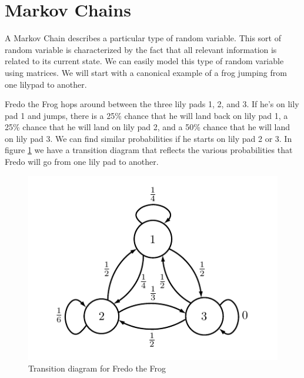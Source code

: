 \label{lab:MarkovGraph}


\section*{Markov Chains}


A Markov Chain describes a particular type of random variable.
This sort of random variable is characterized by the fact that all relevant information is related to its current state.
We can easily model this type of random variable using matrices.
We will start with a canonical example of a frog jumping from one lilypad to another.

Fredo the Frog hops around between the three lily pads 1, 2, and 3.
If he's on lily pad 1 and jumps, there is a 25\% chance that he will land back on lily pad 1, a 25\% chance that he will land on lily pad 2, and a 50\% chance that he will land on lily pad 3.
We can find similar probabilities if he starts on lily pad 2 or 3.
In figure \ref{markov1} we have a transition diagram that reflects the various probabilities that Fredo will go from one lily pad to another.

\begin{figure}[h!]
\begin{center}
\includegraphics[scale = 1]{markov1}
\end{center}
\caption{Transition diagram for Fredo the Frog}
\label{markov1}
\end{figure}

